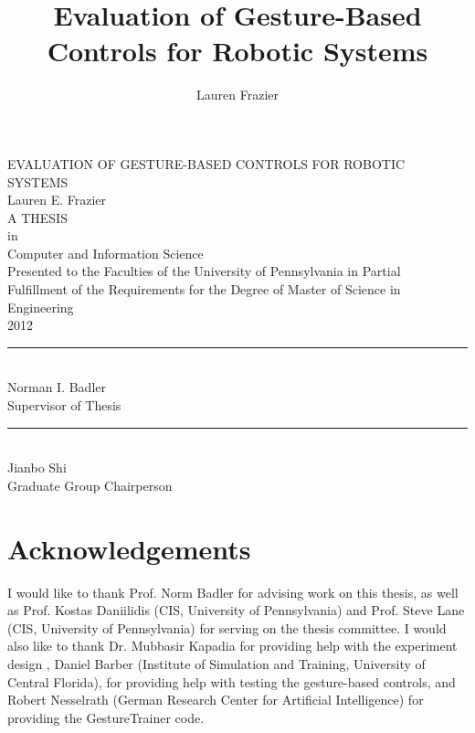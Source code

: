 \documentclass[12pt, letterpaper]{report}
\author{Lauren Frazier}
\title{Evaluation of Gesture-Based Controls for Robotic Systems}
\begin{document}
\begin{titlepage}
\begin{center}
{ \Large EVALUATION OF GESTURE-BASED CONTROLS FOR ROBOTIC SYSTEMS} \\[1cm]

{\Large Lauren E. Frazier} \\[1cm]

{A THESIS} \\[1cm]

in \\[1cm]

{\Large Computer and Information Science}\\[1.5cm]

{\normalsize Presented to the Faculties of the University of Pennsylvania in Partial\\ 
Fulfillment of the Requirements for the Degree of Master of Science in Engineering}\\[0.75cm]

2012 \\[1.5cm]

\singlespacing
\rule{0.6\linewidth}{0.1mm} \\
Norman I. Badler\\
Supervisor of Thesis \\[2cm]

\rule{0.6\linewidth}{0.1mm} \\
Jianbo Shi\\
Graduate Group Chairperson
\end{center}
\end{titlepage}
\doublespacing

\pagestyle{myheadings}
\markright{}
\tableofcontents
\setcounter{page}{2}
\listoftables
\listoffigures

\chapter*{Acknowledgements}
I would like to thank Prof. Norm Badler for advising work on this thesis, as well as Prof. Kostas Daniilidis (CIS, University of Pennsylvania) and Prof. Steve Lane (CIS, University of Pennsylvania) for serving on the thesis committee. I would also like to thank Dr. Mubbasir Kapadia for providing help with the experiment design , Daniel Barber (Institute of Simulation and Training, University of Central Florida), for providing help with testing the gesture-based controls, and Robert Nesselrath  (German Research Center for Artificial Intelligence) for providing the GestureTrainer code.
\end{document}

